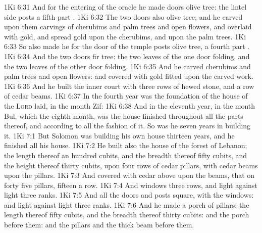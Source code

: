 \vs 1Ki 6:31 And for the entering of the oracle he made doors  olive tree: the lintel  side posts  a fifth part .
\vs 1Ki 6:32 The two doors also  olive tree; and he carved upon them carvings of cherubims and palm trees and open flowers, and overlaid  with gold, and spread gold upon the cherubims, and upon the palm trees.
\vs 1Ki 6:33 So also made he for the door of the temple posts  olive tree, a fourth part .
\vs 1Ki 6:34 And the two doors  fir tree: the two leaves of the one door  folding, and the two leaves of the other door  folding.
\vs 1Ki 6:35 And he carved  cherubims and palm trees and open flowers: and covered  with gold fitted upon the carved work.
\vs 1Ki 6:36 And he built the inner court with three rows of hewed stone, and a row of cedar beams.
\vs 1Ki 6:37 In the fourth year was the foundation of the house of the \textsc{Lord} laid, in the month Zif:
\vs 1Ki 6:38 And in the eleventh year, in the month Bul, which  the eighth month, was the house finished throughout all the parts thereof, and according to all the fashion of it. So was he seven years in building it.
\vs 1Ki 7:1 But Solomon was building his own house thirteen years, and he finished all his house.
\vs 1Ki 7:2 He built also the house of the forest of Lebanon; the length thereof  an hundred cubits, and the breadth thereof fifty cubits, and the height thereof thirty cubits, upon four rows of cedar pillars, with cedar beams upon the pillars.
\vs 1Ki 7:3 And  covered with cedar above upon the beams, that  on forty five pillars, fifteen  a row.
\vs 1Ki 7:4 And  windows  three rows, and light  against light  three ranks.
\vs 1Ki 7:5 And all the doors and posts  square, with the windows: and light  against light  three ranks.
\vs 1Ki 7:6 And he made a porch of pillars; the length thereof  fifty cubits, and the breadth thereof thirty cubits: and the porch  before them: and the  pillars and the thick beam  before them.
